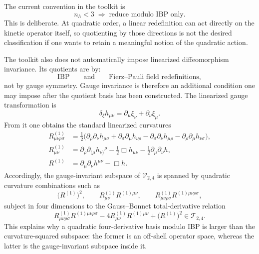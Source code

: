 \documentclass[11pt]{report}
\numberwithin{equation}{chapter}
\newcommand{\Vspace}[2]{\mathcal{V}_{#1,#2}}
\newcommand{\Tspace}[2]{\mathcal{T}_{#1,#2}}
\begin{document}
The current convention in the toolkit is
\begin{equation}
  n_h < 3 \; \Longrightarrow \; \text{reduce modulo IBP only}.
  \label{eq:quadratic_convention}
\end{equation}
This is deliberate.
At quadratic order, a linear redefinition can act directly on the kinetic operator itself, so quotienting by those directions is not the desired classification if one wants to retain a meaningful notion of the quadratic action.

The toolkit also does not automatically impose linearized diffeomorphism invariance.
Its quotients are by:
\begin{equation}
  \text{IBP}
  \qquad \text{and} \qquad
  \text{Fierz--Pauli field redefinitions},
\end{equation}
not by gauge symmetry.
Gauge invariance is therefore an additional condition one may impose after the quotient basis has been constructed.
The linearized gauge transformation is
\begin{equation}
  \delta_\xi h_{\mu\nu}
  =
  \partial_\mu \xi_\nu + \partial_\nu \xi_\mu .
  \label{eq:linear_gauge_transform}
\end{equation}
From it one obtains the standard linearized curvatures
\begin{align}
  R^{(1)}_{\mu\nu\rho\sigma}
  &=
  \tfrac{1}{2}
  \bigl(
    \partial_\rho \partial_\nu h_{\mu\sigma}
    + \partial_\sigma \partial_\mu h_{\nu\rho}
    - \partial_\sigma \partial_\nu h_{\mu\rho}
    - \partial_\rho \partial_\mu h_{\nu\sigma}
  \bigr),
  \label{eq:linear_riemann}
  \\
  R^{(1)}_{\mu\nu}
  &=
  \partial_\rho \partial_{(\mu} h_{\nu)}{}^\rho
  - \tfrac{1}{2}\Box h_{\mu\nu}
  - \tfrac{1}{2}\partial_\mu \partial_\nu h,
  \label{eq:linear_ricci}
  \\
  R^{(1)}
  &=
  \partial_\mu \partial_\nu h^{\mu\nu} - \Box h.
  \label{eq:linear_scalar_curvature}
\end{align}
Accordingly, the gauge-invariant subspace of \(\Vspace{2}{4}\) is spanned by quadratic curvature combinations such as
\begin{equation}
  \bigl(R^{(1)}\bigr)^2,
  \qquad
  R^{(1)}_{\mu\nu} R^{(1)\mu\nu},
  \qquad
  R^{(1)}_{\mu\nu\rho\sigma} R^{(1)\mu\nu\rho\sigma},
  \label{eq:curvature_squared_space}
\end{equation}
subject in four dimensions to the Gauss--Bonnet total-derivative relation
\begin{equation}
  R^{(1)}_{\mu\nu\rho\sigma} R^{(1)\mu\nu\rho\sigma}
  - 4 R^{(1)}_{\mu\nu} R^{(1)\mu\nu}
  + \bigl(R^{(1)}\bigr)^2
  \in
  \Tspace{2}{4}.
  \label{eq:gauss_bonnet_linearized}
\end{equation}
This explains why a quadratic four-derivative basis modulo IBP is larger than the curvature-squared subspace:
the former is an off-shell operator space, whereas the latter is the gauge-invariant subspace inside it.
\end{document}
